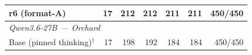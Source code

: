 \begin{table}[t]
{\begin{tabular}{lrrrrrr}
r6 (format-A) & 17 & 212 & 212 & 211 & 211 & 450/450 \\
\midrule
\multicolumn{7}{l}{\textit{Qwen3.6-27B --- Orchard}} \\
Base (pinned thinking)$^{\dagger}$ & 17 & 198 & 192 & 184 & 184 & 450/450 \\
\bottomrule
\end{tabular}%
}
\end{table}
